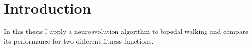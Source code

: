 \section{Introduction}
\label{sec:intro}


In this thesis I apply a neuroevolution algorithm to bipedal walking and compare its performance for two different fitness functions.


